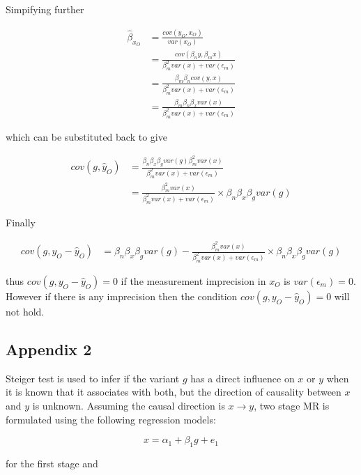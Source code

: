 \documentclass[]{article}
\begin{document}
Simpifying further

\[
\begin{aligned}
\hat{\beta}_{x_O} & = \frac{cov(y_O, x_O)} {var(x_O)} \\
                  & = \frac{cov(\beta_n y, \beta_m x)} {\beta_m^2 var(x) + var(\epsilon_m)} \\
                  & = \frac{\beta_m \beta_n cov(y, x)} {\beta_m^2 var(x) + var(\epsilon_m)} \\
                  & = \frac{\beta_m \beta_n \beta_x var(x)} {\beta_m^2 var(x) + var(\epsilon_m)}
\end{aligned}
\]

which can be substituted back to give

\[
\begin{aligned}
cov(g, \hat{y}_O) & = \frac{\beta_n \beta_x \beta_g var(g) \beta_m^2 var(x)} {\beta_m^2 var(x) + var(\epsilon_m)} \\
                  & = \frac{\beta_m^2 var(x)} {\beta_m^2 var(x) + var(\epsilon_m)} \times \beta_n \beta_x \beta_g var(g)
\end{aligned}
\]

Finally

\[
\begin{aligned}
cov(g, y_O - \hat{y}_O) & = \beta_n \beta_x \beta_g var(g) - \frac{\beta_m^2 var(x)} {\beta_m^2 var(x) + var(\epsilon_m)} \times \beta_n \beta_x \beta_g var(g)
\end{aligned}
\]

thus \(cov(g, y_O - \hat{y}_O) = 0\) if the measurement imprecision in
\(x_O\) is \(var(\epsilon_m) = 0\). However if there is any imprecision
then the condition \(cov(g, y_O - \hat{y}_O) = 0\) will not hold.

\newpage

\subsection{Appendix 2}\label{appendix-2}

Steiger test is used to infer if the variant \(g\) has a direct
influence on \(x\) or \(y\) when it is known that it associates with
both, but the direction of causality between \(x\) and \(y\) is unknown.
Assuming the causal direction is \(x \to y\), two stage MR is formulated
using the following regression models:

\[
x = \alpha_1 + \beta_1 g + e_1
\]

for the first stage and
\end{document}
